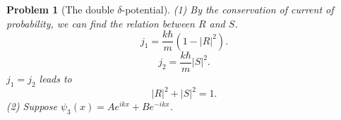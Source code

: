 \documentclass{article}
\theoremstyle{1}
\newtheorem{problem}{Problem}
\begin{document}
\begin{problem}[The double $\delta$-potential]
    (1) By the conservation of current of probability, we can find the relation between $R$ and $S$.
    \begin{equation}
        j_1=\frac{k\hbar}{m}\left(1-\left|R\right|^2\right).
    \end{equation}
    \begin{equation}
        j_2=\frac{k\hbar}{m}\left|S\right|^2.
    \end{equation}
    $j_1=j_2$ leads to 
    \begin{equation}
        \boxed{\left|R\right|^2+\left|S\right|^2=1.}
    \end{equation}
    (2) Suppose $\psi_3(x)=Ae^{ikx}+Be^{-ikx}$.

    

\begin{center}

\begin{tikzpicture}[x=0.7pt,y=0.7pt,yscale=-0.8,xscale=0.8]


\end{tikzpicture}
\end{center}
\end{problem}
\end{document}
